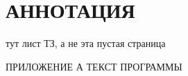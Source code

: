 

\section*{АННОТАЦИЯ}


\newpage
{}
тут лист ТЗ, а не эта пустая страница

\newpage
{}
\renewcommand{\contentsname}{\normalsize \bfseries СОДЕРЖАНИЕ}
\tableofcontents
\noindent
ПРИЛОЖЕНИЕ А ТЕКСТ ПРОГРАММЫ

\newcommand{\GPRPhantomSection}[2]{{
    \newpage
    \phantomsection
    \addcontentsline{toc}{section}{#1}
    \section*{#1}
    
    \newpage
}}
\newcommand{\GPRSectionHeader}[1]{{
    \newpage
    \section{#1}
}}
\newcommand{\GPRSection}[2]{{
    \def \VarGPRSection {#2}
    \newpage
    \section{#1}
    
    \newpage
}}
\newcommand{\GPRSectionFile}[2]{{
    \def \VarGPRSection {#2}
    \newpage
    \section{#1}
    
    \newpage
}}
\newcommand{\GPRSubSectionHeader}[1]{{
    \subsection{#1}
}}
\newcommand{\GPRSubSubSectionHeader}[1]{{
    \subsubsection{#1}
}}
\newcommand{\GPRSubSection}[2]{{
    \GPRSubSectionHeader{#1}
    
}}
\newcommand{\GPREconomicSection}[2]{{
    \def \VarGPREconomicAnnotaion {#1}
    \def \VarGPREconomicConclusion {#2}
    
    \newpage
}}
